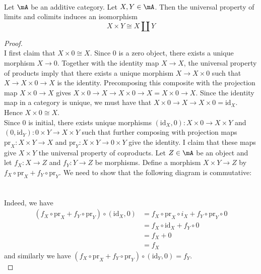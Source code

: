 \documentclass[a4paper]{article}
\begin{document}
\begin{lmm}{}{}\\
Let $\mA$ be an additive category. Let $X,Y\in\mA$. Then the universal property of limits and colimits induces an isomorphism $$X\times Y\cong X\coprod Y$$
\begin{proof}\\
I first claim that $X\times 0\cong X$. Since $0$ is a zero object, there exists a unique morphism $X\to 0$. Together with the identity map $X\to X$, the universal property of products imply that there exists a unique morphism $X\to X\times 0$ such that $X\to X\times 0\to X$ is the identity. Precomposing this composite with the projection map $X\times 0\to X$ gives $X\times 0\to X\to X\times 0\to X=X\times 0\to X$. Since the identity map in a category is unique, we must have that $X\times 0\to X\to X\times 0=\text{id}_X$. Hence $X\times 0\cong X$. \\

Since $0$ is initial, there exists unique morphisms $(\text{id}_X,0):X\times 0\to X\times Y$ and $(0,\text{id}_Y):0\times Y\to X\times Y$ such that further composing with projection maps $\text{pr}_X:X\times Y\to X$ and $\text{pr}_Y:X\times Y\to 0\times Y$ give the identity. I claim that these maps give $X\times Y$ the universal property of coproducts. Let $Z\in\mA$ be an object and let $f_X:X\to Z$ and $f_Y:Y\to Z$ be morphisms. Define a morphism $X\times Y\to Z$ by $f_X\circ\text{pr}_X+f_Y\circ\text{pr}_Y$. We need to show that the following diagram is commutative: \\
 \\~\\
Indeed, we have 
\begin{align*}
(f_X\circ\text{pr}_X+f_Y\circ\text{pr}_Y)\circ(\text{id}_X,0)&=f_X\circ\text{pr}_X\circ i_X+f_Y\circ\text{pr}_Y\circ 0\tag{$\mA$ is pre-additive}\\
&=f_X\circ\text{id}_X+f_Y\circ 0\\
&=f_X+0\\
&=f_X
\end{align*}
and similarly we have $(f_X\circ\text{pr}_X+f_Y\circ\text{pr}_Y)\circ(\text{id}_Y,0)=f_Y$. \\


\end{proof}
\end{lmm}
\end{document}
